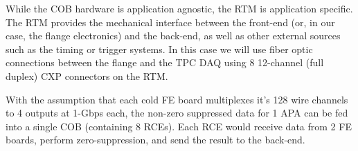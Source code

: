 While the COB hardware is application agnostic,  the RTM is application specific. The RTM provides the mechanical interface between the front-end (or, in our case, the flange electronics) and the back-end, as well as other external sources such as the timing or trigger systems.  In this case we will use fiber optic connections between the flange and the TPC DAQ using 8 12-channel (full duplex) CXP connectors on the RTM. 

With the assumption that each cold FE board multiplexes it's 128 wire channels to 4 outputs at 1-Gbps each, the non-zero suppressed data for 1 APA can be fed into a single COB (containing 8 RCEs).  Each RCE would receive data from 2 FE boards, perform zero-suppression, and send the result to the back-end.  








